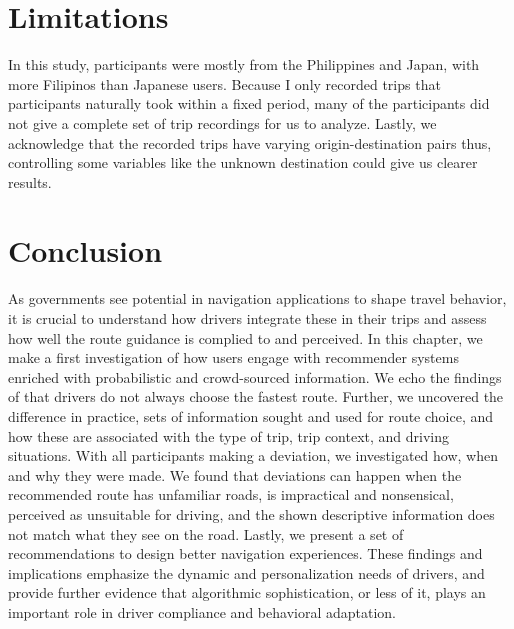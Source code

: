 \section{Limitations}
In this study, participants were mostly from the Philippines and Japan, with more Filipinos than Japanese users. Because I only recorded trips that participants naturally took within a fixed period, many of the participants did not give a complete set of trip recordings for us to analyze. Lastly, we acknowledge that the recorded trips have varying origin-destination pairs thus, controlling some variables like the unknown destination could give us clearer results. 

\section{Conclusion}
As governments see potential in navigation applications to shape travel behavior, it is crucial to understand how drivers integrate these in their trips and assess how well the route guidance is complied to and perceived. In this chapter, we make a first investigation of how users engage with recommender systems enriched with probabilistic and crowd-sourced information. We echo the findings of \cite{Quercia2014, Zhu2015DoPrinciple,Tang2016AnalyzingData,Fujino2018DetectingTracks,Brown2012TheGPS} that drivers do not always choose the fastest route. Further, we uncovered the difference in practice, sets of information sought and used for route choice, and how these are associated with the type of trip, trip context, and driving situations. With all participants making a deviation, we investigated how, when and why they were made. We found that deviations can happen when the recommended route has unfamiliar roads, is impractical and nonsensical, perceived as unsuitable for driving, and the shown descriptive information does not match what they see on the road. Lastly, we present a set of recommendations to design better navigation experiences. These findings and implications emphasize the dynamic and personalization needs of drivers, and provide further evidence that algorithmic sophistication, or less of it, plays an important role in driver compliance and behavioral adaptation.